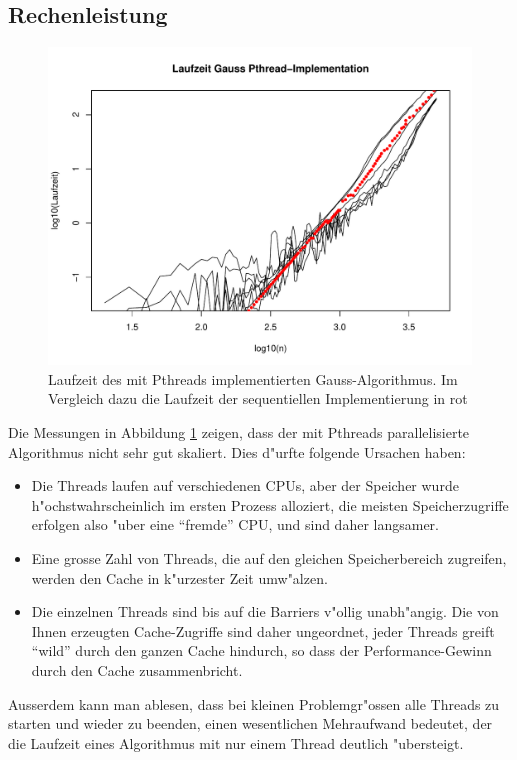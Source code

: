 \subsection{Rechenleistung}
\begin{figure}
\begin{center}
\includegraphics[width=\hsize]{images/gauss-pthread.pdf}
\end{center}
\caption{Laufzeit des mit Pthreads implementierten Gauss-Algorithmus.
Im Vergleich dazu die Laufzeit der sequentiellen Implementierung 
in rot\label{gauss-pthread}}
\end{figure}
Die Messungen in Abbildung \ref{gauss-pthread} zeigen, dass der mit
Pthreads parallelisierte Algorithmus nicht sehr gut skaliert. Dies
d"urfte folgende Ursachen haben:
\begin{itemize}
\item
Die Threads laufen auf verschiedenen CPUs, aber der Speicher wurde
h"ochstwahrscheinlich im ersten Prozess alloziert, die meisten
Speicherzugriffe erfolgen also "uber eine ``fremde'' CPU, und sind
daher langsamer.
\item
Eine grosse Zahl von Threads, die auf den gleichen Speicherbereich
zugreifen, werden den Cache in k"urzester Zeit umw"alzen.
\item
Die einzelnen Threads sind bis auf die Barriers v"ollig unabh"angig.
Die von Ihnen erzeugten Cache-Zugriffe sind daher ungeordnet, jeder
Threads greift ``wild'' durch den ganzen Cache hindurch, so dass
der Performance-Gewinn durch den Cache zusammenbricht.
\end{itemize}
Ausserdem kann man ablesen, dass bei kleinen Problemgr"ossen 
alle Threads zu starten und wieder zu beenden, einen wesentlichen 
Mehraufwand bedeutet, der die Laufzeit eines Algorithmus mit nur
einem Thread deutlich "ubersteigt.

